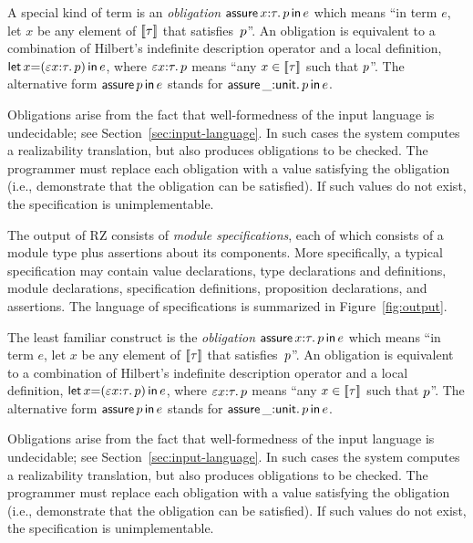 A special kind of term is an
\emph{obligation} $\mathsf{assure}\,x{:}\tau.\,p\,\mathsf{in}\,e$ which means ``in term
$e$, let $x$ be any element of $[\![\tau]\!]$ that satisfies~$p$''.
An obligation is equivalent to a combination of Hilbert's indefinite
description operator and a local definition,
$\mathsf{let}\,x{=}(\varepsilon x {:} \tau.\,p)\,\mathsf{in}\,e$, where
$\varepsilon x {:} \tau.\, p$ means ``any $x \in [\![\tau]\!]$
such that $p$''. The alternative form $\mathsf{assure}\,p\,\mathsf{in}\,e$ stands
for $\mathsf{assure}\,\_{:}\mathsf{unit}.\,p\,\mathsf{in}\,e$. 

Obligations arise from the fact that well-formedness 
of the input language is undecidable; see Section~\ref{sec:input-language}.  
In such cases the system computes a realizability translation, but also produces obligations 
to be checked.  The programmer must
replace each obligation with a value satisfying the
obligation (i.e., demonstrate that the obligation can be satisfied). 
If such values do not exist, the specification is
unimplementable.

\else %

The output of RZ consists of \emph{module specifications}, each of which consists of a module type
plus assertions about its components.  More specifically, a typical specification
may contain value declarations, type declarations and definitions, module
declarations, specification definitions, proposition declarations, and
assertions.  The language of specifications is summarized in
Figure~\ref{fig:output}.

The least familiar construct is the 
\emph{obligation} $\mathsf{assure}\,x{:}\tau.\,p\,\mathsf{in}\,e$ which means ``in term
$e$, let $x$ be any element of $[\![\tau]\!]$ that satisfies~$p$''.
An obligation is equivalent to a combination of Hilbert's indefinite
description operator and a local definition,
$\mathsf{let}\,x{=}(\varepsilon x {:} \tau.\,p)\,\mathsf{in}\,e$, where
$\varepsilon x {:} \tau.\, p$ means ``any $x \in [\![\tau]\!]$
such that $p$''. The alternative form $\mathsf{assure}\,p\,\mathsf{in}\,e$ stands
for $\mathsf{assure}\,\_{:}\mathsf{unit}.\,p\,\mathsf{in}\,e$. 

Obligations arise from the fact that well-formedness 
of the input language is undecidable; see Section~\ref{sec:input-language}.  
In such cases the system computes a realizability translation, but also produces obligations 
to be checked.  The programmer must
replace each obligation with a value satisfying the
obligation (i.e., demonstrate that the obligation can be satisfied). 
If such values do not exist, the specification is
unimplementable.

\fi %

